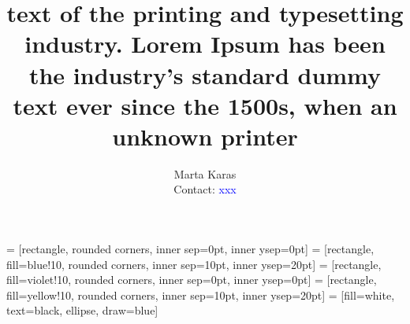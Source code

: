 \documentclass[portrait,a0,final]{a0poster}\usepackage[]{graphicx}\usepackage[]{color}
\title{\Huge text of the printing and typesetting industry. Lorem Ipsum has been the industry's standard dummy text ever since the 1500s, when an unknown printer}
\date{}
\author{{Marta Karas}\\ \Large Contact: \textcolor{blue}{xxx}}
\begin{document}
\pagestyle{empty}
\maketitle
\Large


 = [rectangle, rounded corners, inner sep=0pt, inner ysep=0pt]
 = [rectangle, fill=blue!10, rounded corners, inner sep=10pt, inner ysep=20pt]
 = [rectangle, fill=violet!10, rounded corners, inner sep=0pt, inner ysep=0pt]
 = [rectangle, fill=yellow!10, rounded corners, inner sep=10pt, inner ysep=20pt]
 = [fill=white, text=black, ellipse, draw=blue]

\vspace{0cm}
\end{document}
